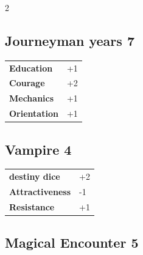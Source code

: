 \begin{multicols}{2}
\begin{tcolorbox}
\end{tcolorbox}

\begin{tcolorbox}
    \subsection*{Journeyman years \hfill \small{7 }}
    \tcblower




\begin{tabular}{@{}ll@{}}
    \textbf{Education} & +1\\
    \textbf{Courage} & +2\\
    \textbf{Mechanics} & +1\\
    \textbf{Orientation} & +1\\
\end{tabular}


\end{tcolorbox}

\begin{tcolorbox}
    \subsection*{Vampire \hfill \small{4 }}
    \tcblower




\begin{tabular}{@{}ll@{}}
    \textbf{destiny dice} & +2\\
    \textbf{Attractiveness} & -1\\
    \textbf{Resistance} & +1\\
\end{tabular}


\end{tcolorbox}

\begin{tcolorbox}
    \subsection*{Magical Encounter \hfill \small{5 }}
    \tcblower





\end{tcolorbox}
\end{multicols}
